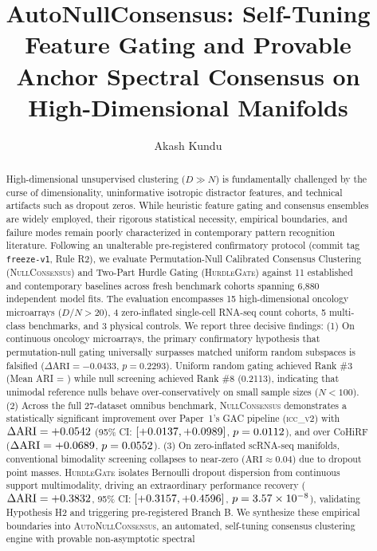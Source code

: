 \documentclass[preprint,12pt]{elsarticle}
\begin{document}
\begin{frontmatter}

\title[AutoNullConsensus]{AutoNullConsensus: Self-Tuning Feature Gating and Provable Anchor Spectral Consensus on High-Dimensional Manifolds}

\author[inst1]{Akash Kundu}


\begin{abstract}
High-dimensional unsupervised clustering ($D \gg N$) is fundamentally challenged by the curse of dimensionality, uninformative isotropic distractor features, and technical artifacts such as dropout zeros. While heuristic feature gating and consensus ensembles are widely employed, their rigorous statistical necessity, empirical boundaries, and failure modes remain poorly characterized in contemporary pattern recognition literature. Following an unalterable pre-registered confirmatory protocol (commit tag \texttt{freeze-v1}, Rule R2), we evaluate Permutation-Null Calibrated Consensus Clustering (\textsc{NullConsensus}) and Two-Part Hurdle Gating (\textsc{HurdleGate}) against 11 established and contemporary baselines across \TotalTestDatasets{} fresh benchmark cohorts spanning 6,880 independent model fits. The evaluation encompasses 15 high-dimensional oncology microarrays ($D/N > 20$), 4 zero-inflated single-cell RNA-seq count cohorts, 5 multi-class benchmarks, and 3 physical controls. We report three decisive findings: (1) On continuous oncology microarrays, the primary confirmatory hypothesis that permutation-null gating universally surpasses matched uniform random subspaces is falsified ($\Delta\text{ARI} = -0.0433$, $p = 0.2293$). Uniform random gating achieved Rank \#3 (Mean ARI = \GrandMeanGacRandomGating) while null screening achieved Rank \#8 (0.2113), indicating that unimodal reference nulls behave over-conservatively on small sample sizes ($N < 100$). (2) Across the full 27-dataset omnibus benchmark, \textsc{NullConsensus} demonstrates a statistically significant improvement over Paper~1's GAC pipeline (\textsc{icc\_v2}) with $\Delta\text{ARI} = +0.0542$ (95\% CI: $[+0.0137, +0.0989]$, $p = 0.0112$), and over CoHiRF ($\Delta\text{ARI} = +0.0689$, $p = 0.0552$). (3) On zero-inflated scRNA-seq manifolds, conventional bimodality screening collapses to near-zero ($\text{ARI} \approx 0.04$) due to dropout point masses. \textsc{HurdleGate} isolates Bernoulli dropout dispersion from continuous support multimodality, driving an extraordinary performance recovery ($\Delta\text{ARI} = +0.3832$, 95\% CI: $[+0.3157, +0.4596]$, $p = 3.57 \times 10^{-8}$), validating Hypothesis H2 and triggering pre-registered Branch B. We synthesize these empirical boundaries into \textsc{AutoNullConsensus}, an automated, self-tuning consensus clustering engine with provable non-asymptotic spectral 
\end{abstract}
\end{frontmatter}
\end{document}
